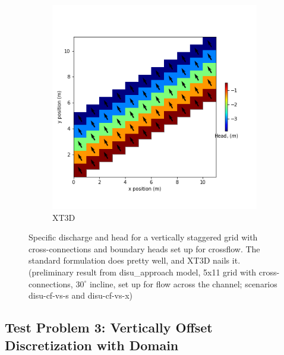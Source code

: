 \documentclass{article}
\begin{document}
\begin{figure}[H]
\begin{subfigure}{0.4\textwidth}
	\includegraphics[width=\textwidth]{../figures/disu-cf-vs-x-head.png}
	\caption{XT3D}
	\label{fig:disu-x-cc-cf-head}
\end{subfigure}
\caption{Specific discharge and head for a vertically staggered grid with cross-connections and boundary heads set up for crossflow. The standard formulation does pretty well, and XT3D nails it. (preliminary result from disu\_approach model, 5x11 grid with cross-connections, $30^{\circ}$ incline, set up for flow across the channel; scenarios disu-cf-vs-s and disu-cf-vs-x)}
\label{fig:figures}
\end{figure}

\subsection{Test Problem 3: Vertically Offset Discretization with Domain}
\end{document}
